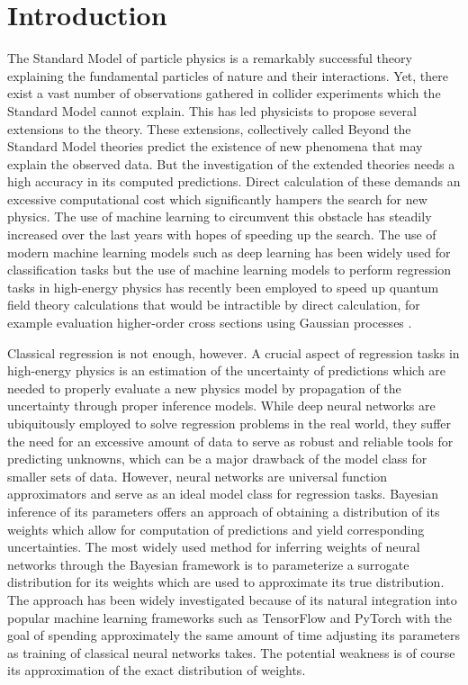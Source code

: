 \chapter*{Introduction}


The Standard Model of particle physics is a remarkably successful theory explaining the fundamental particles of nature and their interactions. Yet, there exist a vast number of observations gathered in collider experiments which the Standard Model cannot explain. 
This has led physicists to propose several extensions to the theory.
These extensions, collectively called Beyond the Standard Model theories predict the existence of new phenomena that may explain the observed data. But the investigation of the extended theories needs a high accuracy in its computed predictions. Direct calculation of these demands an excessive computational cost which significantly hampers the search for new physics. The use of machine learning to 
circumvent this obstacle has steadily increased over the last years with hopes of speeding up the search. The use of modern machine learning models such as deep learning has been widely used for classification tasks but the use of machine learning models to perform regression tasks in high-energy physics has recently been employed to speed up quantum field theory calculations that would be intractible by direct calculation, for example evaluation higher-order cross sections using Gaussian processes \cite{xsec}. 

Classical regression is not enough, however. A crucial aspect of regression tasks in high-energy physics is an estimation of the uncertainty of predictions which are needed to properly evaluate a new physics model by propagation of the uncertainty through proper inference models. While deep neural networks are ubiquitously employed to solve regression problems in the real world, they suffer the need for an excessive amount of data to serve as robust and reliable tools for predicting unknowns, which can be a major drawback of the model class for smaller sets of data. However, neural networks are universal function approximators and serve as an ideal model class for regression tasks. Bayesian inference of its parameters offers an approach of obtaining a distribution of its weights which allow for computation of predictions and yield corresponding uncertainties. The most widely used method for inferring weights of neural networks through the Bayesian framework is to parameterize a surrogate distribution for its weights which are used to approximate its true distribution. The approach has been widely investigated because of its natural integration into popular machine learning frameworks such as TensorFlow and PyTorch with the goal of spending approximately the same amount of time adjusting its parameters as training of classical neural networks takes. The potential weakness is of course its approximation of the exact distribution of weights. 

